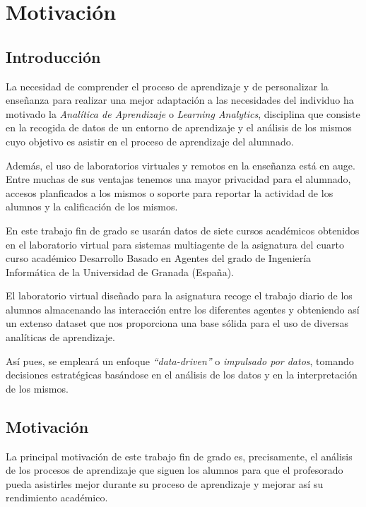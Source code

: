 \chapter*{Motivación}

\section{Introducción}

La necesidad de comprender el proceso de aprendizaje y de personalizar la enseñanza para realizar una mejor adaptación a las necesidades del individuo ha motivado la \emph{Analítica de Aprendizaje} o \emph{Learning Analytics}, disciplina que consiste en la recogida de datos de un entorno de aprendizaje y el análisis de los mismos cuyo objetivo es asistir en el proceso de aprendizaje del alumnado.

Además, el uso de laboratorios virtuales y remotos en la enseñanza está en auge. Entre muchas de sus ventajas tenemos una mayor privacidad para el alumnado, accesos planficados a los mismos o soporte para reportar la actividad de los alumnos y la calificación de los mismos.

En este trabajo fin de grado se usarán datos de siete cursos académicos obtenidos en el laboratorio virtual para sistemas multiagente de la asignatura del cuarto curso académico Desarrollo Basado en Agentes del grado de Ingeniería Informática de la Universidad de Granada (España).

El laboratorio virtual diseñado para la asignatura recoge el trabajo diario de los alumnos almacenando las interacción entre los diferentes agentes y obteniendo así un extenso dataset que nos proporciona una base sólida para el uso de diversas analíticas de aprendizaje.

Así pues, se empleará un enfoque \emph{``data-driven''} o \emph{impulsado por datos}, tomando decisiones estratégicas basándose en el análisis de los datos y en la interpretación de los mismos.

\section{Motivación}

La principal motivación de este trabajo fin de grado es, precisamente, el análisis de los procesos de aprendizaje que siguen los alumnos para que el profesorado pueda asistirles mejor durante su proceso de aprendizaje y mejorar así su rendimiento académico.


